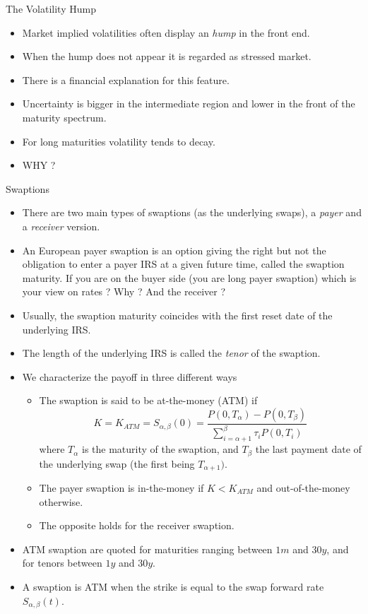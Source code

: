 \documentclass{beamer}
\begin{document}
\begin{frame}{The Volatility Hump}
	\begin{itemize}
		\item Market implied volatilities often display an \emph{hump} in the front end.
		\item When the hump does not appear it is regarded as stressed market.
		\item There is a financial explanation for this feature.
		\item Uncertainty is bigger in the intermediate region and lower in the front of the maturity spectrum.
		\item For long maturities volatility tends to decay.
		\item WHY ?
	\end{itemize}
\end{frame}

\begin{frame}{Swaptions}
	\begin{itemize}
		\item There are two main types of swaptions (as the underlying swaps), a \emph{payer} and a \emph{receiver} version.
		\item An European payer swaption is an option giving the right but not the obligation to enter a payer IRS at a given future time, called the swaption maturity. If you are on the buyer side (you are long payer swaption) which is your view on rates ? Why ? And the receiver ?
		\item Usually, the swaption maturity coincides with the first reset date of the underlying IRS.
		\item The length of the underlying IRS is called the \emph{tenor} of the swaption.
		\item We characterize the payoff in three different ways
		\begin{itemize}
			\item The swaption is said to be at-the-money (ATM) if
			\begin{equation}
				K = K_{ATM} = S_{\alpha,\beta}(0) = \frac{P(0,T_\alpha)-P(0,T_\beta)}{\sum_{i=\alpha+1}^\beta \tau_i P(0,T_i)}
			\end{equation}
			where $T_\alpha$ is the maturity of the swaption, and $T_\beta$ the last payment date of the underlying swap (the first being $T_{\alpha+1})$.
			\item The payer swaption is in-the-money if $K<K_{ATM}$ and out-of-the-money otherwise.
			\item The opposite holds for the receiver swaption.
		\end{itemize}
		\item ATM swaption are quoted for maturities ranging between $1m$ and $30y$, and for tenors between $1y$ and $30y$.
		\item A swaption is ATM when the strike is equal to the swap forward rate $S_{\alpha,\beta}(t)$.
	\end{itemize}
\end{frame}
\end{document}
